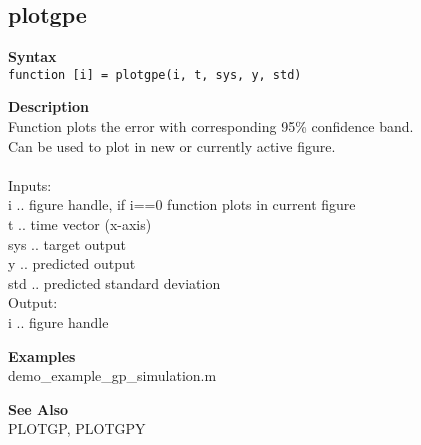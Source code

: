 \subsection*{plotgpe} \label{fun:plotgpe}


\textbf{Syntax}
\\  \texttt{function [i] = plotgpe(i, t, sys, y, std)}

\textbf{Description}
\\ Function plots the error with corresponding 95\% confidence band.
\\ Can be used to plot in new or currently active figure.
\\
\\ Inputs:
\\ i .. figure handle, if i==0 function plots in current figure
\\ t .. time vector (x-axis)
\\ sys .. target output
\\ y .. predicted output
\\ std .. predicted standard deviation
\\ Output:
\\ i .. figure handle

\textbf{Examples}
\\ demo\_example\_gp\_simulation.m

\textbf{See Also}
\\ PLOTGP, PLOTGPY

